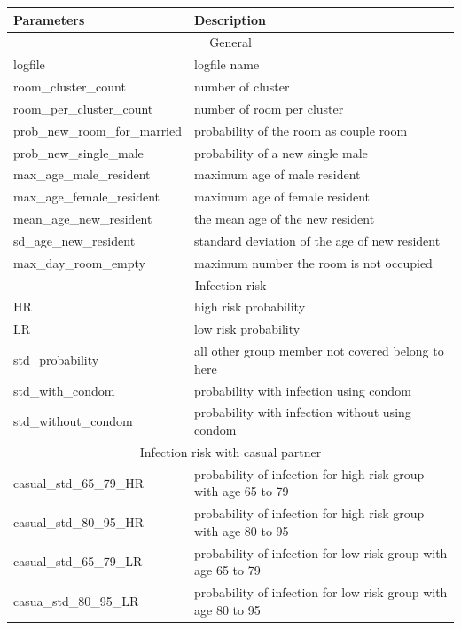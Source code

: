 \documentclass{article}
\begin{document}
\begin{normalsize}
    \begin{table}[H]
	\centering
    	\begin{tabular}{ |p{5cm}|p{7cm}| } 
    		\hline
    		Parameters & Description\\
    		\hline
    		\multicolumn{2}{|c|}{General} \\
    		\hline
    		logfile & logfile name\\
    		room\_cluster\_count & number of cluster\\
    		room\_per\_cluster\_count & number of room per cluster\\
    		prob\_new\_room\_for\_married & probability of the room as couple room\\
    		prob\_new\_single\_male & probability of a new single male\\
    		max\_age\_male\_resident & maximum age of male resident\\
    		max\_age\_female\_resident & maximum age of female resident\\
    		mean\_age\_new\_resident & the mean age of the new resident\\ 
    		sd\_age\_new\_resident & standard deviation of the age of new resident\\
    		max\_day\_room\_empty & maximum number the room is not occupied\\
   			\hline
   			\multicolumn{2}{|c|}{Infection risk} \\
   			\hline
   			HR & high risk probability\\
   			LR & low risk probability\\
   			std\_probability & all other group member not covered belong to here\\
   			std\_with\_condom & probability with infection using condom\\
   			std\_without\_condom & probability with infection without using condom\\
   			\hline
   			\multicolumn{2}{|c|}{Infection risk with casual partner} \\
   			\hline
   			casual\_std\_65\_79\_HR & probability of infection for high risk group with age 65 to 79\\
   			casual\_std\_80\_95\_HR & probability of infection for high risk group with age 80 to 95\\
   			casual\_std\_65\_79\_LR & probability of infection for low risk group with age 65 to 79\\
   			casua\_std\_80\_95\_LR & probability of infection for low risk group with age 80 to 95\\

\end{tabular}
\end{table}
\end{normalsize}
\end{document}
